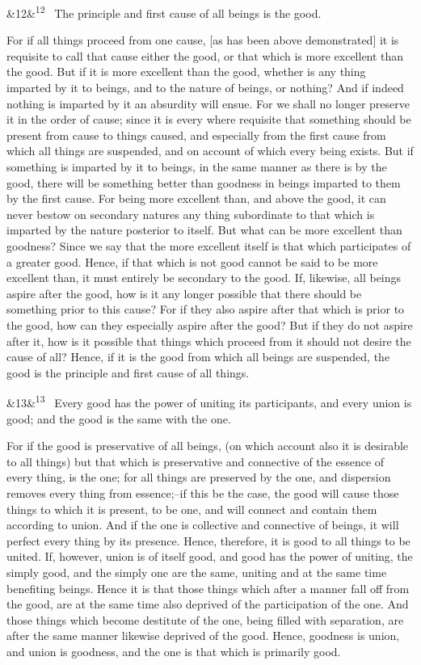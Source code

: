 \documentclass[12pt]{article}
\newcommand{\para}[1][]{\par\noindent\ifx&#1&\else\textsuperscript{\footnotesize #1}~\fi}
\begin{document}
\para[12] The principle and first cause of all beings is the good.

For if all things proceed from one cause, [as has been above demonstrated] it is requisite to call that cause either the good, or that which is more excellent than the good. But if it is more excellent than the good, whether is any thing imparted by it to beings, and to the nature of beings, or nothing? And if indeed nothing is imparted by it an absurdity will ensue. For we shall no longer preserve it in the order of cause; since it is every where requisite that something should be present from cause to things caused, and especially from the first cause from which all things are suspended, and on account of which every being exists. But if something is imparted by it to beings, in the same manner as there is by the good, there will be something better than goodness in beings imparted to them by the first cause. For being more excellent than, and above the good, it can never bestow on secondary natures any thing subordinate to that which is imparted by the nature posterior to itself. But what can be more excellent than goodness? Since we say that the more excellent itself is that which participates of a greater good. Hence, if that which is not good cannot be said to be more excellent than, it must entirely be secondary to the good. If, likewise, all beings aspire after the good, how is it any longer possible that there should be something prior to this cause? For if they also aspire after that which is prior to the good, how can they especially aspire after the good? But if they do not aspire after it, how is it possible that things which proceed from it should not desire the cause of all? Hence, if it is the good from which all beings are suspended, the good is the principle and first cause of all things.

\para[13] Every good has the power of uniting its participants, and every union is good; and the good is the same with the one.

For if the good is preservative of all beings, (on which account also it is desirable to all things) but that which is preservative and connective of the essence of every thing, is the one; for all things are preserved by the one, and dispersion removes every thing from essence;--if this be the case, the good will cause those things to which it is present, to be one, and will connect and contain them according to union. And if the one is collective and connective of beings, it will perfect every thing by its presence. Hence, therefore, it is good to all things to be united. If, however, union is of itself good, and good has the power of uniting, the simply good, and the simply one are the same, uniting and at the same time benefiting beings. Hence it is that those things which after a manner fall off from the good, are at the same time also deprived of the participation of the one. And those things which become destitute of the one, being filled with separation, are after the same manner likewise deprived of the good. Hence, goodness is union, and union is goodness, and the one is that which is primarily good.
\end{document}
